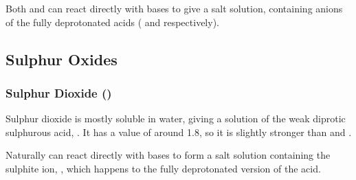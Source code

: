 			Both  and  can react directly with bases to give a salt solution, containing anions of the fully deprotonated
			acids ( and  respectively).





		\pagebreak
		\subsection{Sulphur Oxides}

			\subsubsection{Sulphur Dioxide ()}

				Sulphur dioxide is mostly soluble in water, giving a solution of the weak diprotic sulphurous acid, . It has a
				\pKa{} value of around \num{1.8}, so it is slightly stronger than  and .



				Naturally  can react directly with bases to form a salt solution containing the sulphite ion, , which
				happens to the fully deprotonated version of the acid.





